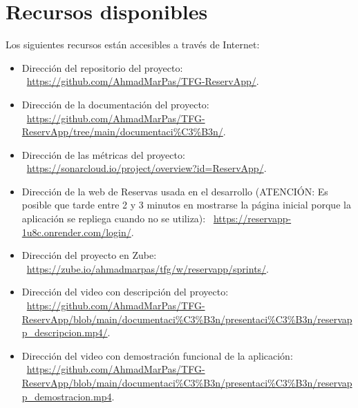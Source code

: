\section{Recursos disponibles}\label{materiales-adjuntos}

Los siguientes recursos están accesibles a través de Internet: 

\begin{itemize}
\tightlist
\item
	Dirección del repositorio del proyecto: ~\url{https://github.com/AhmadMarPas/TFG-ReservApp/}.
\item
	Dirección de la documentación del proyecto: ~\url{https://github.com/AhmadMarPas/TFG-ReservApp/tree/main/documentaci%C3%B3n/}.
\item
	Dirección de las métricas del proyecto: ~\url{https://sonarcloud.io/project/overview?id=ReservApp/}.
\item
    Dirección de la web de Reservas usada en el desarrollo (ATENCIÓN: Es posible que tarde entre 2 y 3 minutos en mostrarse la página inicial porque la aplicación se repliega cuando no se utiliza): ~\url{https://reservapp-1u8c.onrender.com/login/}.
\item
	Dirección del proyecto en Zube: ~\url{https://zube.io/ahmadmarpas/tfg/w/reservapp/sprints/}.	
\item
	Dirección del video con descripción del proyecto: ~\url{https://github.com/AhmadMarPas/TFG-ReservApp/blob/main/documentaci%C3%B3n/presentaci%C3%B3n/reservapp_descripcion.mp4/}.
\item
	Dirección del video con demostración funcional de la aplicación: ~\url{https://github.com/AhmadMarPas/TFG-ReservApp/blob/main/documentaci%C3%B3n/presentaci%C3%B3n/reservapp_demostracion.mp4}.
\end{itemize}
